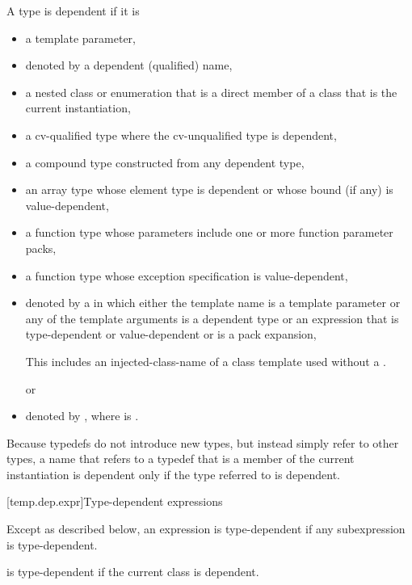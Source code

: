\pnum
A type is dependent if it is
\begin{itemize}
\item
a template parameter,
\item
denoted by a dependent (qualified) name,
\item
a nested class or enumeration that is a direct member of
a class that is the current instantiation,
\item
a cv-qualified type where the cv-unqualified type is dependent,
\item
a compound type constructed from any dependent type,
\item
an array type whose element type is dependent or whose
bound (if any) is value-dependent,
\item
a function type whose parameters include one or more function parameter packs,
\item
a function type whose exception specification is value-dependent,
\item
denoted by a 
in which either the template name is a template parameter or any of the
template arguments is a dependent type or an expression that is type-dependent
or value-dependent or is a pack expansion,
\begin{footnote}
This includes an injected-class-name of a class template
used without a .
\end{footnote}
or
\item denoted by \tcode{)},
where  is .
\end{itemize}

\pnum
\begin{note}
Because typedefs do not introduce new types, but
instead simply refer to other types, a name that refers to a
typedef that is a member of the current instantiation is dependent
only if the type referred to is dependent.
\end{note}

[temp.dep.expr]{Type-dependent expressions}

\pnum
Except as described below, an expression is type-dependent if any
subexpression is type-dependent.

\pnum
{}
is type-dependent if the current class is
dependent.


